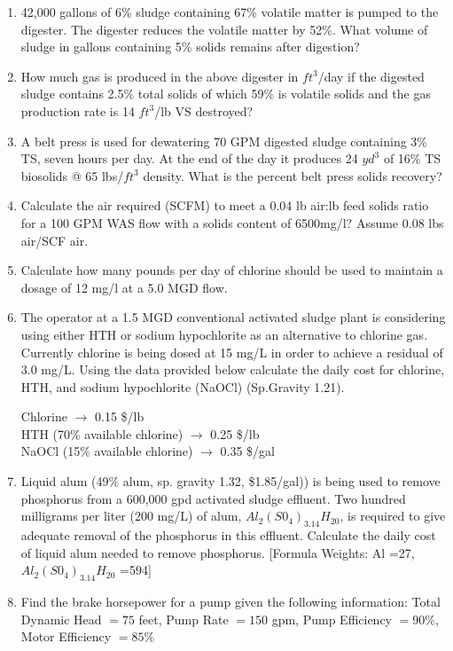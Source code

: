 \begin{tcolorbox}[breakable, enhanced,
colframe=blue!25,
colback=blue!10,
coltitle=blue!20!black,  
title= Chapter Assessment]
\begin{enumerate}
\item 42,000 gallons of 6\% sludge containing 67\% volatile matter is pumped to the digester.  The digester reduces the volatile matter by 52\%.  What volume of sludge in gallons containing 5\% solids remains after digestion? 

\item How much gas is produced in the above digester in $ft^3$/day if the digested sludge contains 2.5\% total solids of which 59\% is volatile solids and the gas production rate is 14 $ft^3$/lb VS destroyed?\\

\item A belt press is used for dewatering 70 GPM digested sludge containing 3\% TS, seven hours per day.  At the end of the day it produces 24 $yd^3$ of 16\% TS \enspace biosolids @ 65 lbs/$ft^3$ density.  What is the percent belt press solids recovery?\\

\item Calculate the air required (SCFM) to meet a 0.04 lb air:lb feed solids ratio for a 100 GPM WAS flow with a solids content of 6500mg/l? Assume 0.08 lbs air/SCF air.\\

\item Calculate how many pounds per day of chlorine should be used to maintain a dosage of 12 mg/l at a 5.0 MGD flow.\\

\item The operator at a 1.5 MGD conventional activated sludge plant is considering using either HTH or sodium hypochlorite as an alternative to chlorine gas. Currently chlorine is being dosed at 15 mg/L in order to achieve a residual of 3.0 mg/L. Using the data provided below calculate the daily cost for chlorine, HTH, and sodium hypochlorite (NaOCl) (Sp.Gravity 1.21).
 
Chlorine $\rightarrow$ 0.15 \$/lb\\
HTH (70\% available chlorine) $\rightarrow$ 0.25 \$/lb\\
NaOCl (15\% available chlorine) $\rightarrow$ 0.35 \$/gal 


\item Liquid alum (49\% alum, sp. gravity 1.32, \$1.85/gal)) is being used to remove phosphorus from a 600,000 gpd activated sludge effluent. Two hundred milligrams per liter (200 mg/L) of alum, $Al_2(S0_4)_3.14H_20$, is required to give adequate removal of the phosphorus in this effluent. Calculate the daily cost of liquid alum needed to remove phosphorus. [Formula Weights: Al =27, $Al_2(S0_4)_3.14H_20$ =594]\\

\item Find the brake horsepower for a pump given the following information: Total Dynamic Head $=75$ feet, Pump Rate $=150$ gpm, Pump Efficiency $=90 \%$, Motor Efficiency $=85 \%$

\end{enumerate}
\end{tcolorbox}
